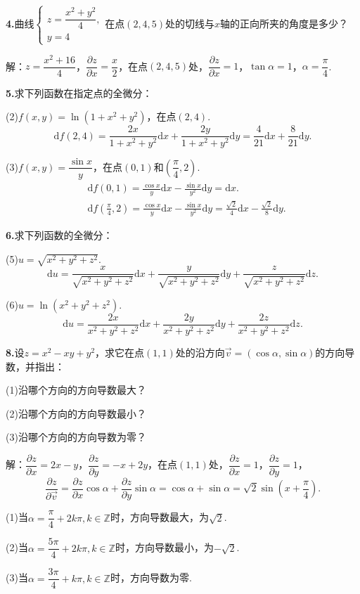 \documentclass[12pt, a4paper]{article}
\newcommand{\dif}{\mathrm{d}}
\begin{document}
\textbf{4.}曲线\(\begin{cases}
z = \dfrac{x^2 + y^2}{4},\\
y = 4
\end{cases}\)在点\((2, 4, 5)\)处的切线与\(x\)轴的正向所夹的角度是多少？

解：\(z = \dfrac{x^2 + 16}{4}\)，\(\dfrac{\partial z}{\partial x} = \dfrac{x}{2}\)，在点\((2, 4, 5)\)处，\(\dfrac{\partial z}{\partial x} = 1\)，\(\tan\alpha = 1\)，\(\alpha = \dfrac{\pi}{4}\).

\textbf{5.}求下列函数在指定点的全微分：

(2)\(f(x, y) = \ln(1 + x^2 + y^2)\)，在点\((2, 4)\).
\[\dif f(2, 4) = \frac{2x}{1 + x^2 + y^2}\dif x + \frac{2y}{1 + x^2 + y^2}\dif y = \frac{4}{21}\dif x + \frac{8}{21}\dif y.\]

(3)\(f(x, y) = \dfrac{\sin x}{y}\)，在点\((0, 1)\)和\(\left(\dfrac{\pi}{4}, 2\right)\).
\begin{align*}
&\dif f(0, 1) = \frac{\cos x}{y}\dif x - \frac{\sin x}{y^2}\dif y = \dif x.\\
&\dif f\left(\frac{\pi}{4}, 2\right) = \frac{\cos x}{y}\dif x - \frac{\sin x}{y^2}\dif y = \frac{\sqrt{2}}{4}\dif x - \frac{\sqrt{2}}{8}\dif y.
\end{align*}

\textbf{6.}求下列函数的全微分：

(5)\(u = \sqrt{x^2 + y^2 + z^2}\).
\[\dif u = \frac{x}{\sqrt{x^2 + y^2 + z^2}}\dif x + \frac{y}{\sqrt{x^2 + y^2 + z^2}}\dif y + \frac{z}{\sqrt{x^2 + y^2 + z^2}}\dif z.\]

(6)\(u = \ln(x^2 + y^2 + z^2)\).
\[\dif u = \frac{2x}{x^2 + y^2 + z^2}\dif x + \frac{2y}{x^2 + y^2 + z^2}\dif y + \frac{2z}{x^2 + y^2 + z^2}\dif z.\]

\textbf{8.}设\(z = x^2 - xy + y^2\)，求它在点\((1, 1)\)处的沿方向\(\vec{v} = (\cos\alpha, \sin\alpha)\)的方向导数，并指出：

(1)沿哪个方向的方向导数最大？

(2)沿哪个方向的方向导数最小？

(3)沿哪个方向的方向导数为零？

解：\(\dfrac{\partial z}{\partial x} = 2x - y\)，\(\dfrac{\partial z}{\partial y} = -x + 2y\)，在点\((1, 1)\)处，\(\dfrac{\partial z}{\partial x} = 1\)，\(\dfrac{\partial z}{\partial y} = 1\)，
\[\frac{\partial z}{\partial \vec{v}} = \frac{\partial z}{\partial x}\cos\alpha + \frac{\partial z}{\partial y}\sin\alpha = \cos\alpha + \sin\alpha = \sqrt{2}\sin\left(x + \frac{\pi}{4}\right).\]

(1)当\(\alpha = \dfrac{\pi}{4} + 2k\pi, k \in \mathbb{Z}\)时，方向导数最大，为\(\sqrt{2}\).

(2)当\(\alpha = \dfrac{5\pi}{4} + 2k\pi, k \in \mathbb{Z}\)时，方向导数最小，为\(-\sqrt{2}\).

(3)当\(\alpha = \dfrac{3\pi}{4} + k\pi, k \in \mathbb{Z}\)时，方向导数为零.
\end{document}
